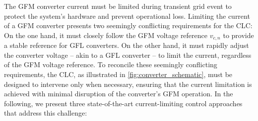 \documentclass[lettersize,journal]{IEEEtran}
\begin{document}
The GFM converter current must be limited during transient grid event to protect the system's hardware and prevent operational loss.
Limiting the current of a GFM converter presents two seemingly conflicting requirements for the CLC:
On the one hand, it must closely follow the GFM voltage reference $v_{c,n}$ to provide a stable reference for GFL converters.
On the other hand, it must rapidly adjust the converter voltage -- akin to a GFL converter -- to limit the current, regardless of the GFM voltage reference.
To reconcile these seemingly conflicting requirements, the CLC, as illustrated in \cref{fig:converter_schematic}, must be designed to intervene only when necessary, ensuring that the current limitation is achieved with minimal disruption of the converter's GFM operation.
In the following, we present three state-of-the-art current-limiting control approaches that address this challenge:
\end{document}

